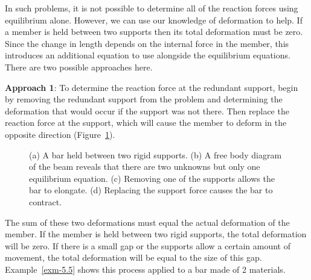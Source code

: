 \documentclass[
  letterpaper,
  DIV=11,
  numbers=noendperiod]{scrreprt}
\theoremstyle{definition}
\theoremstyle{remark}
\begin{document}
In such problems, it is not possible to determine all of the reaction
forces using equilibrium alone. However, we can use our knowledge of
deformation to help. If a member is held between two supports then its
total deformation must be zero. Since the change in length depends on
the internal force in the member, this introduces an additional equation
to use alongside the equilibrium equations. There are two possible
approaches here.

\textbf{Approach 1}: To determine the reaction force at the redundant
support, begin by removing the redundant support from the problem and
determining the deformation that would occur if the support was not
there. Then replace the reaction force at the support, which will cause
the member to deform in the opposite direction (Figure~\ref{fig-5.11}).

\begin{figure}


\caption{\label{fig-5.11}(a) A bar held between two rigid supports. (b)
A free body diagram of the beam reveals that there are two unknowns but
only one equilibrium equation. (c) Removing one of the supports allows
the bar to elongate. (d) Replacing the support force causes the bar to
contract.}

\end{figure}%

The sum of these two deformations must equal the actual deformation of
the member. If the member is held between two rigid supports, the total
deformation will be zero. If there is a small gap or the supports allow
a certain amount of movement, the total deformation will be equal to the
size of this gap. Example~\ref{exm-5.5} shows this process applied to a
bar made of 2 materials.
\end{document}

